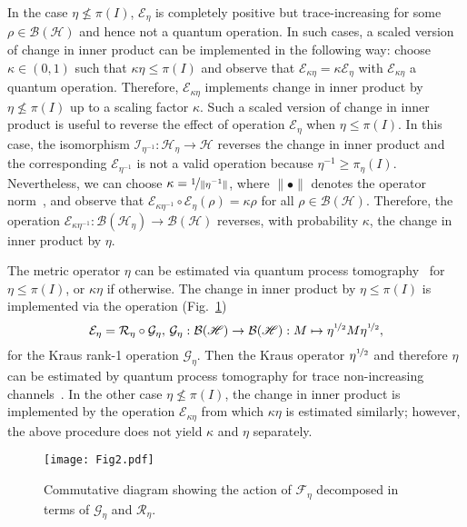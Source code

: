\documentclass[amsmath,amssymb,aps,pra,superscriptaddress,twocolumn]{revtex4-2}
\begin{document}
In the case $\eta \nleq \pi(I)$,
$\mathcal{E}_\eta$
is completely positive
but trace-increasing for some $\rho\in\mathcal{B}(\mathscr{H})$ 
and hence not a quantum operation.
In such cases, a scaled version of change in inner product can be implemented in the following way:
choose $\kappa\in(0,1)$ such that $\kappa\eta\leq \pi(I)$ and observe that 
$\mathcal{E}_{\kappa\eta} = \kappa\mathcal{E}_\eta$ with 
$\mathcal{E}_{\kappa\eta}$ a quantum operation. 
Therefore, $\mathcal{E}_{\kappa\eta}$  implements change in inner product by $\eta \nleq \pi(I)$
up to a scaling factor $\kappa$.
Such a scaled version of change in inner product is useful to reverse the effect of operation 
$\mathcal{E}_\eta$ when $\eta \leq \pi(I)$.
In this case, the isomorphism $\mathcal{I}_{\eta^{-1}}:\mathscr{H}_\eta\to\mathscr{H}$
reverses the change in inner product and the corresponding $\mathcal{E}_{\eta^{-1}}$
is not a valid operation because  $\eta^{-1} \ge \pi_{\eta}(I)$.
Nevertheless, we can choose $\kappa = \nicefrac{1}{\|\eta^{-1}\|}$, 
where $\|\bullet\|$ denotes the operator norm~\cite{Con07}, 
and observe that $\mathcal{E}_{\kappa\eta^{-1}}\circ\mathcal{E}_{\eta}(\rho)=\kappa \rho$ 
for all $\rho\in \mathcal{B}(\mathscr{H})$.
Therefore, the operation   
$\mathcal{E}_{\kappa\eta^{-1}}:\mathcal{B}(\mathscr{H}_{\eta})\to\mathcal{B}(\mathscr{H})$ 
reverses, with probability $\kappa$, the change in inner product by $\eta$. 


The metric operator $\eta$ can be estimated via quantum process tomography~\cite{CN97} 
for $\eta\leq \pi(I)$,
or $\kappa \eta$ if otherwise.
The change in inner product by $\eta\leq \pi(I)$ is implemented via the operation 
(Fig.~\ref{fig:Etilde})
\begin{equation}
\label{eq:F}
\mathcal{E}_\eta= \mathcal{R}_{\eta}\circ \mathcal{G}_\eta,\,    
\mathcal{G}_\eta:\mathcal{B}(\mathscr H)\to \mathcal{B}(\mathscr H):M \mapsto \eta^{\nicefrac{1}{2}}M\eta^{\nicefrac{1}{2}},
\end{equation}
for the Kraus rank-1 operation $\mathcal{G}_\eta$.
Then the Kraus operator $\eta^{\nicefrac{1}{2}}$ and therefore $\eta$
can be estimated by quantum process tomography for trace non-increasing channels~\cite{BSS+10}.
In the other case $\eta\nleq \pi(I)$,
the change in inner product is implemented by the operation  
$\mathcal{E}_{\kappa\eta}$ from which $\kappa \eta$ is estimated similarly; however, 
the above procedure does not yield $\kappa$ and $\eta$ separately.
\begin{figure}
    \begin{center}
    \texttt{[image: Fig2.pdf]}
    \end{center}
    \caption{Commutative diagram showing the action of $\mathcal{F}_\eta$ decomposed in terms of $\mathcal{G}_\eta$ and $\mathcal{R}_\eta$.}
    \label{fig:Etilde}
\end{figure}
\end{document}
